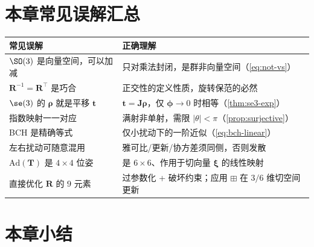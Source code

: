 \section*{本章常见误解汇总}
\begin{table}[H]\centering\small
\begin{tabular}{p{} p{}}
\toprule
\textbf{常见误解} & \textbf{正确理解} \\
\midrule
$\SO(3)$ 是向量空间，可以加减 & 只对乘法封闭，是群非向量空间（\cref{eq:not-vs}）\\
$\mathbf{R}^{-1}=\mathbf{R}^\top$ 是巧合 & 正交性的定义性质，旋转保范的必然 \\
$\se(3)$ 的 $\boldsymbol{\rho}$ 就是平移 $\mathbf{t}$ & $\mathbf{t}=\mathbf{J}\boldsymbol{\rho}$，仅 $\boldsymbol{\phi}\to0$ 时相等（\cref{thm:se3-exp}）\\
指数映射一一对应 & 满射非单射，需限 $|\theta|<\pi$（\cref{prop:surjective}）\\
BCH 是精确等式 & 仅小扰动下的一阶近似（\cref{eq:bch-linear}）\\
左右扰动可随意混用 & 雅可比/更新/协方差须同侧，否则发散 \\
$\mathrm{Ad}(\mathbf{T})$ 是 $4\times4$ 位姿 & 是 $6\times6$、作用于切向量 $\boldsymbol{\xi}$ 的线性映射 \\
直接优化 $\mathbf{R}$ 的 $9$ 元素 & 过参数化 + 破坏约束；应用 $\boxplus$ 在 $3/6$ 维切空间更新 \\
\bottomrule
\end{tabular}
\end{table}

\section*{本章小结}

